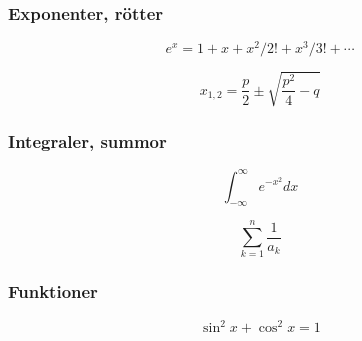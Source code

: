 \begin{frame}[fragile,t]
  \frametitle{Exponenter, rötter}
  \vspace{2em}

  \begin{exlatex}
\begin{displaymath}
  e^x = 1+x+x^2/2!+x^3/3!+\cdots
\end{displaymath}
  \end{exlatex}

  \vspace{1cm}

  \begin{exlatex}
\begin{displaymath}
  x_{1,2}=\frac{p}{2}\pm
  \sqrt{\frac{p^2}{4}-q}
\end{displaymath}
  \end{exlatex}

\end{frame}



\begin{frame}[fragile,t]
  \frametitle{Integraler, summor}
  \vspace{2em}

  \begin{exlatex}
\begin{displaymath}
  \int_{-\infty}^{\infty}
  e^{-x^2} dx
\end{displaymath}
  \end{exlatex}

  \vspace{1cm}

  \begin{exlatex}
\begin{displaymath}
  \sum_{k=1}^n\frac{1}{a_k}
\end{displaymath}
  \end{exlatex}

\end{frame}

\begin{frame}[fragile,t]
  \frametitle{Funktioner}
  \vspace{2em}

  \begin{exlatex}
\begin{displaymath}
  \sin^2 x + \cos^2 x = 1
\end{displaymath}
  \end{exlatex}
\end{frame}


